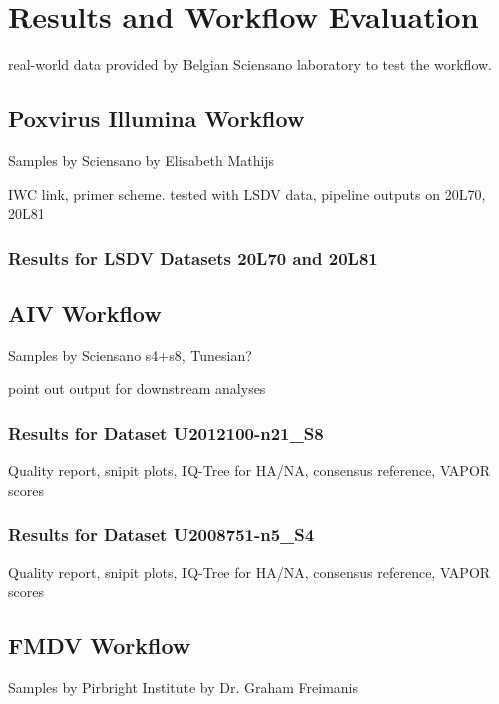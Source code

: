 \chapter{Results and Workflow Evaluation}\label{chap:results}

real-world data provided by Belgian Sciensano laboratory to test the workflow.

\section{Poxvirus Illumina Workflow}
Samples by Sciensano by Elisabeth Mathijs

IWC link, primer scheme.
tested with LSDV data,
pipeline outputs on 20L70, 20L81

\subsection{Results for LSDV Datasets 20L70 and 20L81}

\section{AIV Workflow}\label{sec:4-aiv} 
Samples by Sciensano s4+s8, Tunesian?

point out output for downstream analyses

\subsection{Results for Dataset U2012100-n21\_S8} %
Quality report, snipit plots, IQ-Tree for HA/NA, consensus reference, VAPOR scores

\subsection{Results for Dataset U2008751-n5\_S4}
Quality report, snipit plots, IQ-Tree for HA/NA, consensus reference, VAPOR scores

\section{FMDV Workflow}
Samples by Pirbright Institute by Dr. Graham Freimanis
